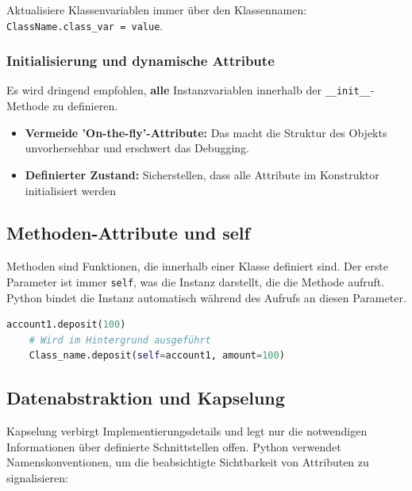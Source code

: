 Aktualisiere Klassenvariablen immer über den Klassennamen: \texttt{ClassName.class\_var = value}.

\subsubsection{Initialisierung und dynamische Attribute}
Es wird dringend empfohlen, \textbf{alle} Instanzvariablen innerhalb der \texttt{\_\_init\_\_}-Methode zu definieren.
\begin{itemize}
    \item \textbf{Vermeide 'On-the-fly'-Attribute:} Das macht die Struktur des Objekts unvorhersehbar und erschwert das Debugging.
    \item \textbf{Definierter Zustand:} Sicherstellen, dass alle Attribute im Konstruktor initialisiert werden
\end{itemize}

\subsection{Methoden-Attribute und self}
Methoden sind Funktionen, die innerhalb einer Klasse definiert sind. Der erste Parameter ist immer \texttt{self}, was die Instanz darstellt, die die Methode aufruft. Python bindet die Instanz automatisch während des Aufrufs an diesen Parameter.

\begin{lstlisting}[language=Python]
    account1.deposit(100)
    # Wird im Hintergrund ausgeführt
    Class_name.deposit(self=account1, amount=100) 
\end{lstlisting}

\subsection{Datenabstraktion und Kapselung}
Kapselung verbirgt Implementierungsdetails und legt nur die notwendigen Informationen über definierte Schnittstellen offen. Python verwendet Namenskonventionen, um die beabsichtigte Sichtbarkeit von Attributen zu signalisieren:

\vspace{1em}

